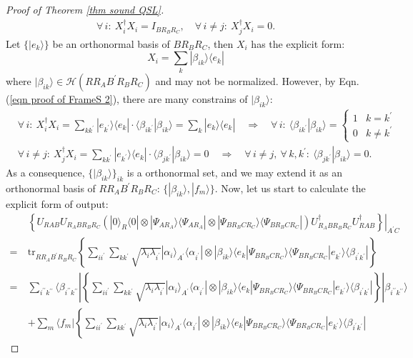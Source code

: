 \documentclass[conference,compsoc, 10pt]{IEEEtran}
\newcommand {\cH } {{\mathcal{H}}}
\newcommand {\rt }[2] {{\left.{#1}\right|_{#2}}}
\newcommand {\tr } {{\mathrm{tr}}}
\def\>{\ensuremath{\rangle}}
\def\<{\ensuremath{\langle}}
\begin{document}
\begin{appendices}
\begin{proof}[Proof of Theorem \ref{thm sound QSL}]
			\begin{align}
			\label{eqn proof of FrameS 2}
			\forall\, i:\ X_i^\dag X_i = I_{BR_BR_C},\quad 
			\forall\, i\neq j:\ X_j^\dag X_i = 0.
			\end{align}
			Let $\{|e_k\>\}$ be an orthonormal basis of $BR_BR_C$, then $X_i$ has the explicit form:
			$$X_i = \sum_k|\beta_{ik}\>\<e_k|$$
			where $|\beta_{ik}\>\in\cH(RR_AB^\prime R_BR_C)$ and may not be normalized. However, by Eqn. (\ref{eqn proof of FrameS 2}), there are many constrains of $|\beta_{ik}\>$:
			\begin{align*}
			&\forall\, i:\ X_i^\dag X_i = \sum_{kk^\prime} |e_{k^\prime}\>\<e_{k}|\cdot\<\beta_{ik^\prime}|\beta_{ik}\> = \sum_k|e_k\>\<e_k| \quad\Rightarrow\quad \forall\, i:\ \<\beta_{ik^\prime}|\beta_{ik}\> = \left\{\begin{array}{ll}1 & k = k^\prime \\ 0 & k\neq k^\prime\end{array}\right. \\
			&\forall\, i\neq j:\ X_j^\dag X_i = \sum_{kk^\prime} |e_{k^\prime}\>\<e_{k}|\cdot\<\beta_{jk^\prime}|\beta_{ik}\> = 0 \quad\Rightarrow\quad \forall\, i\neq j,\ \forall\, k,k^\prime:\ \<\beta_{jk^\prime}|\beta_{ik}\> = 0.
			\end{align*}
			As a consequence, $\{|\beta_{ik}\>\}_{ik}$ is a orthonormal set, and we may extend it as an orthonormal basis of $RR_AB^\prime R_BR_C$: $\{|\beta_{ik}\>, |f_m\>\}.$ Now, let us start to calculate the explicit form of output:
			\begin{align*}
			&\rt{\left\{U_{RAB}U_{R_ABR_BR_C}(|0\>_R\<0|\otimes|\Psi_{AR_A}\>\<\Psi_{AR_A}|\otimes|\Psi_{BR_BCR_C}\>\<\Psi_{BR_BCR_C}|)U^\dag_{R_ABR_BR_C}U_{RAB}^\dag\right\}}{A^\prime C} \\
			=\ &\tr_{RR_AB^\prime R_BR_C}\left\{
			\sum_{ii^\prime}\sum_{kk^\prime}\sqrt{\lambda_i\lambda_{i^\prime}}|\alpha_i\>_{A^\prime}\<\alpha_{i^\prime}|\otimes |\beta_{ik}\>\<e_k|\Psi_{BR_BCR_C}\>\<\Psi_{BR_BCR_C}|e_{k^\prime}\>\<\beta_{i^\prime k^\prime}|
			\right\} \\
			=\ &\sum_{i^{\prime\prime}k^{\prime\prime}}\<\beta_{i^{\prime\prime}k^{\prime\prime}}|\left\{
			\sum_{ii^\prime}\sum_{kk^\prime}\sqrt{\lambda_i\lambda_{i^\prime}}|\alpha_i\>_{A^\prime}\<\alpha_{i^\prime}|\otimes |\beta_{ik}\>\<e_k|\Psi_{BR_BCR_C}\>\<\Psi_{BR_BCR_C}|e_{k^\prime}\>\<\beta_{i^\prime k^\prime}|
			\right\}|\beta_{i^{\prime\prime}k^{\prime\prime}}\> \\
			& + \sum_{m}\<f_m|\left\{
			\sum_{ii^\prime}\sum_{kk^\prime}\sqrt{\lambda_i\lambda_{i^\prime}}|\alpha_i\>_{A^\prime}\<\alpha_{i^\prime}|\otimes |\beta_{ik}\>\<e_k|\Psi_{BR_BCR_C}\>\<\Psi_{BR_BCR_C}|e_{k^\prime}\>\<\beta_{i^\prime k^\prime}|

\end{align*}
\end{proof}
\end{appendices}
\end{document}
